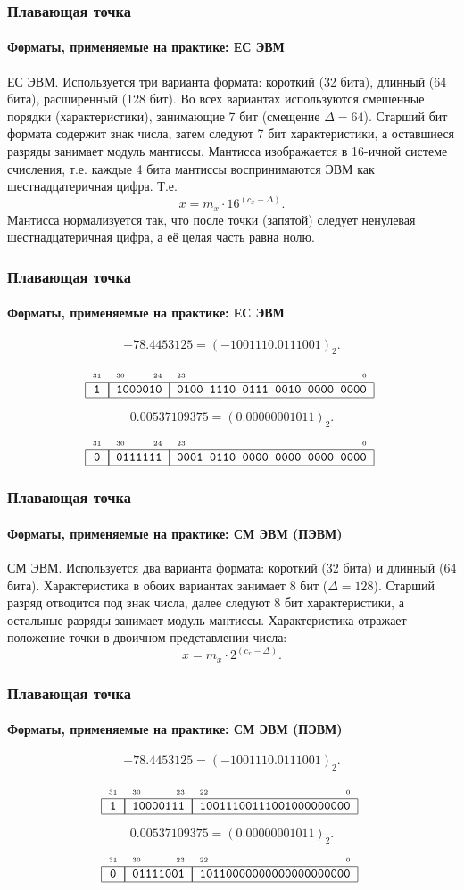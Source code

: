 \begin{frame}
    \frametitle{Плавающая точка}
    \framesubtitle{Форматы, применяемые на практике: ЕС ЭВМ}
    
    ЕС ЭВМ. Используется три варианта формата: короткий (32 бита), длинный (64 бита), расширенный (128 бит). Во всех вариантах используются смешенные порядки (характеристики), занимающие 7 бит (смещение $\Delta = 64$). Старший бит формата содержит знак числа, затем следуют 7 бит характеристики, а оставшиеся разряды занимает модуль мантиссы. Мантисса изображается в 16-ичной системе счисления, т.е. каждые 4 бита мантиссы воспринимаются ЭВМ как шестнадцатеричная цифра. Т.е. 
    \[x=m_x\cdot 16^{(c_x-\Delta)}.\] 
    Мантисса нормализуется так, что после точки (запятой) следует ненулевая шестнадцатеричная цифра, а её целая часть равна нолю.
\end{frame}

\begin{frame}
    \frametitle{Плавающая точка}
    \framesubtitle{Форматы, применяемые на практике: ЕС ЭВМ}

    \[-78.4453125 = (-1001110.0111001)_2.\]

    \[
        \FloatESShort{1}{1000010}{0100 1110 0111 0010 0000 0000}
    \]
    
    \[0.00537109375 = (0.00000001011)_2.\]
    \[
        \FloatESShort{0}{0111111}{0001 0110 0000 0000 0000 0000}
    \]
\end{frame}

\begin{frame}
    \frametitle{Плавающая точка}
    \framesubtitle{Форматы, применяемые на практике: СМ ЭВМ (ПЭВМ)}
    
    СМ ЭВМ. Используется два варианта формата: короткий (32 бита) и длинный (64 бита). Характеристика в обоих вариантах занимает 8 бит ($\Delta = 128$). Старший разряд отводится под знак числа, далее следуют 8 бит характеристики, а остальные разряды занимает модуль мантиссы. Характеристика отражает положение точки в двоичном представлении числа:
    \[x=m_x\cdot 2^{(c_x-\Delta)}.\]
\end{frame}

\begin{frame}
    \frametitle{Плавающая точка}
    \framesubtitle{Форматы, применяемые на практике:  СМ ЭВМ (ПЭВМ)}

    \[-78.4453125 = (-1001110.0111001)_2.\]

    \[
        \FloatPCShort{1}{10000111}{10011100111001000000000}
    \]
    
    \[0.00537109375 = (0.00000001011)_2.\]
    \[
        \FloatPCShort{0}{01111001}{10110000000000000000000}
    \]
\end{frame}

